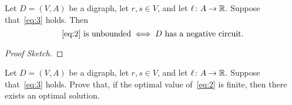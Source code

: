 \documentclass[10pt,reqno]{amsart}
\begin{document}
\begin{proposition}
  \label{prop:2}
  Let \(D = (V,A)\) be a digraph, let \(r,s \in V\), and let
  \(\ell \colon A \to \mathbb{R}\).  Suppose that~\eqref{eq:3} holds.
  Then
  \begin{equation}
    \label{eq:5}
    \text{\eqref{eq:2} is unbounded}
    \iff
    \text{\(D\) has a negative circuit}.
  \end{equation}
\end{proposition}
\begin{proof}[Proof Sketch]
  
\end{proof}

\begin{exercise}
  \label{ex:4}
  Let \(D = (V,A)\) be a digraph, let \(r,s \in V\), and let
  \(\ell \colon A \to \mathbb{R}\).  Suppose that~\eqref{eq:3} holds.
  Prove that, if the optimal value of~\eqref{eq:2} is finite, then
  there exists an optimal solution.
\end{exercise}
\end{document}
